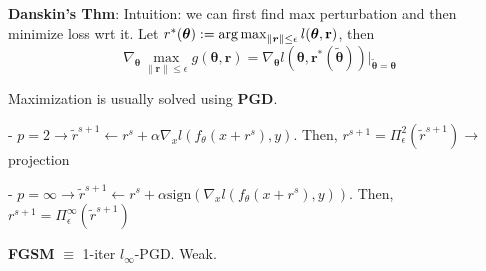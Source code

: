 \textbf{Danskin's Thm}: Intuition: we can first find max perturbation and then minimize loss wrt it. Let $r^*(\boldsymbol \theta):=\operatorname*{arg\,max}_{\|\boldsymbol r\|\leq \epsilon} l(\boldsymbol \theta, \mathbf r)$, then $$\nabla_{\boldsymbol\theta}\max_{\|\mathbf r\|\leq \epsilon} g(\boldsymbol\theta, \mathbf r)=\nabla_{\boldsymbol\theta}l(\boldsymbol\theta, \mathbf r^*(\tilde{\boldsymbol\theta}))|_{\boldsymbol{\tilde\theta}=\boldsymbol\theta}$$ 

Maximization is usually solved using \textbf{PGD}. 

- $p=2 \to \tilde r^{s+1} \leftarrow r^s + \alpha \nabla_x l(f_\theta(x+r^s), y)$. Then, $r^{s+1} = \Pi_\epsilon^2(\tilde r^{s+1}) \to$ projection

- $p=\infty \to \tilde r^{s+1} \leftarrow r^s + \alpha \text{sign}(\nabla_x l(f_\theta(x+r^s), y))$. Then, $r^{s+1} = \Pi_\epsilon^\infty(\tilde r^{s+1})$

\textbf{FGSM} $\equiv$ 1-iter $l_\infty$-PGD. Weak.